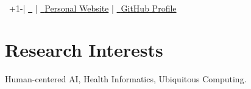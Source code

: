 \begin{center}
    \textbf{\Huge \name} \\
    \vspace{3mm}
 \raisebox{0.0\height}{\footnotesize \faPhone}\ +1-\phone  |
 \href{mailto:\emaila}{\raisebox{0.0\height}{\footnotesize \faEnvelope}\ {\emaila}}  |
 \href{\website}{\raisebox{0.0\height}{\footnotesize \faGlobe}\ {Personal Website}} |
 \href{https://eugeniayang.github.io/}{\raisebox{0.0\height}{\footnotesize \faGithub}\ {GitHub Profile}} 
\end{center}





\section{\textbf{Research Interests}}
\vspace{1mm}
\resumeItemListStart
\item{Human-centered AI, Health Informatics,  Ubiquitous Computing.}
\resumeItemListEnd
\vspace{-3mm}